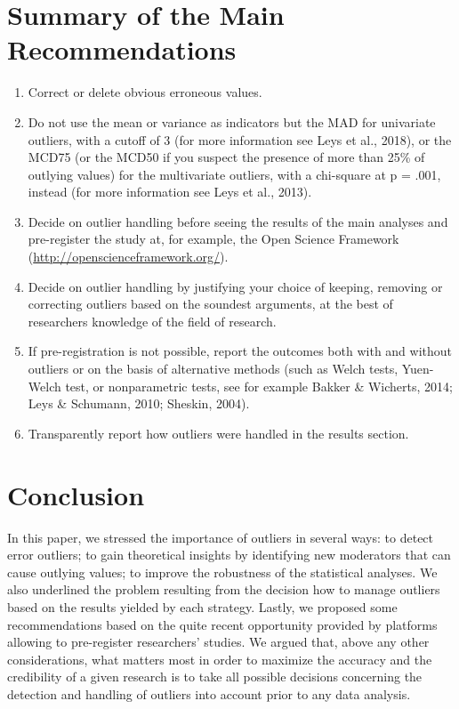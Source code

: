 \documentclass[man,floatsintext]{apa6}
\providecommand{\tightlist}{%
  \setlength{\itemsep}{0pt}\setlength{\parskip}{0pt}}
\begin{document}
\hypertarget{summary-of-the-main-recommendations}{%
\section{Summary of the Main Recommendations}\label{summary-of-the-main-recommendations}}

\begin{enumerate}
\def\labelenumi{\arabic{enumi})}
\tightlist
\item
  Correct or delete obvious erroneous values.
\item
  Do not use the mean or variance as indicators but the MAD for univariate outliers, with a cutoff of 3 (for more information see Leys et al., 2018), or the MCD75 (or the MCD50 if you suspect the presence of more than 25\% of outlying values) for the multivariate outliers, with a chi-square at p = .001, instead (for more information see Leys et al., 2013).
\item
  Decide on outlier handling before seeing the results of the main analyses and pre-register the study at, for example, the Open Science Framework (\url{http://openscienceframework.org/}).
\item
  Decide on outlier handling by justifying your choice of keeping, removing or correcting outliers based on the soundest arguments, at the best of researchers knowledge of the field of research.
\item
  If pre-registration is not possible, report the outcomes both with and without outliers or on the basis of alternative methods (such as Welch tests, Yuen-Welch test, or nonparametric tests, see for example Bakker \& Wicherts, 2014; Leys \& Schumann, 2010; Sheskin, 2004).
\item
  Transparently report how outliers were handled in the results section.
\end{enumerate}

\hypertarget{conclusion}{%
\section{Conclusion}\label{conclusion}}

In this paper, we stressed the importance of outliers in several ways: to detect error outliers; to gain theoretical insights by identifying new moderators that can cause outlying values; to improve the robustness of the statistical analyses. We also underlined the problem resulting from the decision how to manage outliers based on the results yielded by each strategy. Lastly, we proposed some recommendations based on the quite recent opportunity provided by platforms allowing to pre-register researchers' studies. We argued that, above any other considerations, what matters most in order to maximize the accuracy and the credibility of a given research is to take all possible decisions concerning the detection and handling of outliers into account prior to any data analysis.
\end{document}
